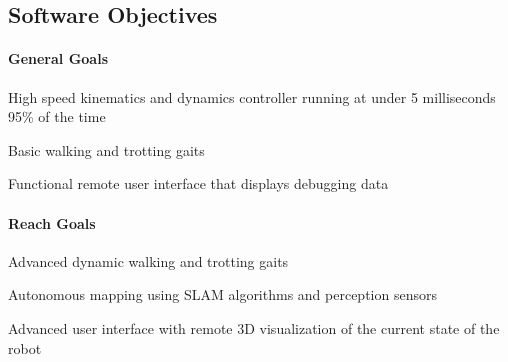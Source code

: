 \subsection*{Software Objectives}
\paragraph*{General Goals}
\begin{Deliverables}
    \item High speed kinematics and dynamics controller running at under 5 milliseconds 95\% of the time
    \item Basic walking and trotting gaits
    \item Functional remote user interface that displays debugging data
\end{Deliverables}
\paragraph*{Reach Goals}
\begin{Deliverables}
    \item Advanced dynamic walking and trotting gaits
    \item Autonomous mapping using SLAM algorithms and perception sensors
    \item Advanced user interface with remote 3D visualization of the current state of the robot
\end{Deliverables}



